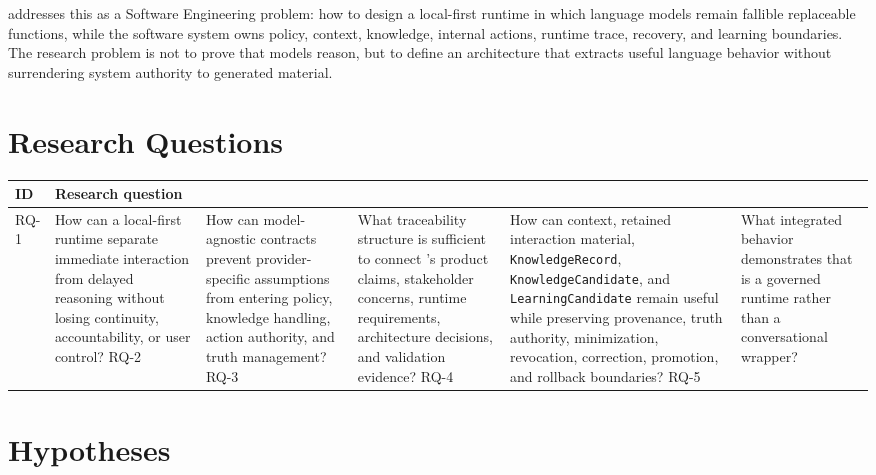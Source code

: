 \Madre addresses this as a Software Engineering problem: how to design a local-first runtime in which language models remain fallible replaceable functions, while the software system owns policy, context, knowledge, internal actions, runtime trace, recovery, and learning boundaries. The research problem is not to prove that models reason, but to define an architecture that extracts useful language behavior without surrendering system authority to generated material.

\section{Research Questions}

\begin{tabularx}{.95\linewidth}{@{}lX@{}}
	\toprule
	\textbf{ID} & \textbf{Research question} \\
	\midrule
	RQ-1 & How can a local-first runtime separate immediate interaction from delayed reasoning without losing continuity, accountability, or user control? \n
	RQ-2 & How can model-agnostic contracts prevent provider-specific assumptions from entering policy, knowledge handling, action authority, and truth management? \n
	RQ-3 & What traceability structure is sufficient to connect \Madre's product claims, stakeholder concerns, runtime requirements, architecture decisions, and validation evidence? \n
	RQ-4 & How can context, retained interaction material, \texttt{KnowledgeRecord}, \texttt{KnowledgeCandidate}, and \texttt{LearningCandidate} remain useful while preserving provenance, truth authority, minimization, revocation, correction, promotion, and rollback boundaries? \n
	RQ-5 & What integrated behavior demonstrates that \Madre is a governed runtime rather than a conversational wrapper? \n
	\bottomrule
\end{tabularx}

\section{Hypotheses}

